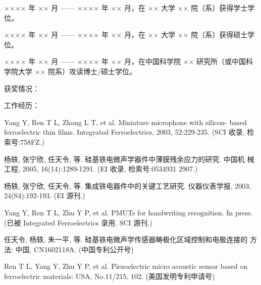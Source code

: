 \begin{resume}


  ×××× 年 ×× 月 —— ×××× 年 ×× 月，在 ×× 大学 ×× 院（系）获得学士学位。
  
  ×××× 年 ×× 月 —— ×××× 年 ×× 月，在 ×× 大学 ×× 院（系）获得硕士学位。
  
  ×××× 年 ×× 月 —— ×××× 年 ×× 月，在中国科学院 ×× 研究所（或中国科学院大学 ×× 院系）攻读博士/硕士学位。
  
  获奖情况：

  工作经历：  


  \begin{publications}
    \item Yang Y, Ren T L, Zhang L T, et al. Miniature microphone with silicon-
      based ferroelectric thin films. Integrated Ferroelectrics, 2003,
      52:229-235. (SCI 收录, 检索号:758FZ.)
    \item 杨轶, 张宁欣, 任天令, 等. 硅基铁电微声学器件中薄膜残余应力的研究. 中国机
      械工程, 2005, 16(14):1289-1291. (EI 收录, 检索号:0534931 2907.)
    \item 杨轶, 张宁欣, 任天令, 等. 集成铁电器件中的关键工艺研究. 仪器仪表学报,
      2003, 24(S4):192-193. (EI 源刊.)
  \end{publications}

  \begin{publications}[before=\publicationskip,after=\publicationskip]
    \item Yang Y, Ren T L, Zhu Y P, et al. PMUTs for handwriting recognition. In
      press. (已被 Integrated Ferroelectrics 录用. SCI 源刊.)
  \end{publications}



  \begin{achievements}
    \item 任天令, 杨轶, 朱一平, 等. 硅基铁电微声学传感器畴极化区域控制和电极连接的
      方法: 中国, CN1602118A. (中国专利公开号)
    \item Ren T L, Yang Y, Zhu Y P, et al. Piezoelectric micro acoustic sensor
      based on ferroelectric materials: USA, No.11/215, 102. (美国发明专利申请号)
  \end{achievements}
  
\end{resume}
